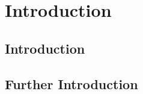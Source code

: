 
\chapter{Introduction}
\begin{tempsection}
\section{Introduction}
\section{Further Introduction}
\end{tempsection}
